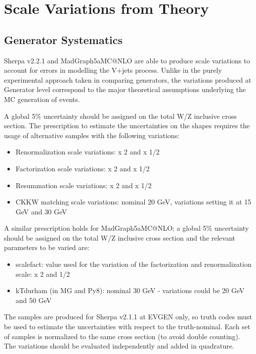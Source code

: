 \section{Scale Variations from Theory}
\label{sec:scalevariations}

\subsection{Generator Systematics}
Sherpa v2.2.1 and MadGraph5\textunderscore aMC@NLO are able to produce scale variations to account for errors in modelling the V+jets process. Unlike in the purely experimental approach taken in comparing generators, the variations produced at Generator level correspond to the major theoretical assumptions underlying the MC generation of events.  

A global 5\% uncertainty should be assigned on the total W/Z inclusive cross section. The prescription to estimate the uncertainties on the shapes requires the usage of alternative samples with the following variations:

\begin{itemize}
\item Renormalization scale variations: x 2 and x 1/2
\item Factorization scale variations: x 2 and x 1/2
\item Resummation scale variations: x 2 and x 1/2
\item CKKW matching scale variations: nominal 20 GeV, variations setting it at 15 GeV and 30 GeV 

\end{itemize}

A similar prescription holds for MadGraph5\textunderscore aMC@NLO; a global 5\% uncertainty should be assigned on the total W/Z inclusive cross section and the relevant parameters to be varied are:
\begin{itemize}
\item scalefact: value used for the variation of the factorization and renormalization scale: x 2 and 1/2
\item kTdurham (in MG and Py8): nominal 30 GeV - variations could be 20 GeV and 50 GeV 
\end{itemize}

The samples are produced for Sherpa v2.1.1 at EVGEN only, so truth codes must be used to estimate the uncertainties with respect to the truth-nominal. Each set of samples is normalized to the same cross section (to avoid double counting). The variations should be evaluated independently and added in quadrature.

